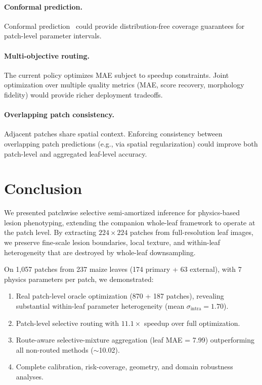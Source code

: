 \documentclass[11pt,a4paper]{article}
\begin{document}
\paragraph{Conformal prediction.}
Conformal prediction~\cite{angelopoulos2023conformal} could provide
distribution-free coverage guarantees for patch-level parameter intervals.

\paragraph{Multi-objective routing.}
The current policy optimizes MAE subject to speedup constraints.
Joint optimization over multiple quality metrics (MAE, score recovery,
morphology fidelity) would provide richer deployment tradeoffs.

\paragraph{Overlapping patch consistency.}
Adjacent patches share spatial context. Enforcing consistency between
overlapping patch predictions (e.g., via spatial regularization)
could improve both patch-level and aggregated leaf-level accuracy.

\section{Conclusion}
\label{sec:conclusion}

We presented patchwise selective semi-amortized inference for physics-based
lesion phenotyping, extending the companion whole-leaf framework to operate
at the patch level. By extracting $224{\times}224$ patches from full-resolution
leaf images, we preserve fine-scale lesion boundaries, local texture,
and within-leaf heterogeneity that are destroyed by whole-leaf downsampling.

On 1{,}057 patches from 237 maize leaves (174 primary + 63 external),
with 7 physics parameters per patch, we demonstrated:
\begin{enumerate}[leftmargin=*,itemsep=2pt]
\item Real patch-level oracle optimization (870 + 187 patches),
  revealing substantial within-leaf parameter heterogeneity
  (mean $\sigma_\text{intra} = 1.70$).
\item Patch-level selective routing with $11.1{\times}$ speedup
  over full optimization.
\item Route-aware selective-mixture aggregation (leaf MAE = 7.99)
  outperforming all non-routed methods (${\sim}$10.02).
\item Complete calibration, risk-coverage, geometry, and
  domain robustness analyses.
\end{enumerate}
\end{document}
